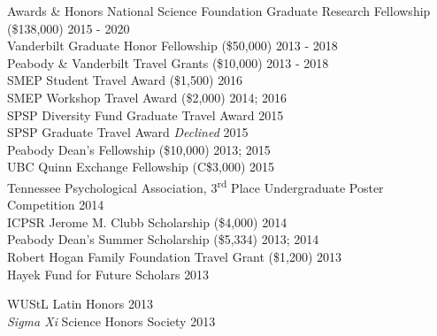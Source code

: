 \begin{rSection}{\textrm{Awards \& Honors}}
National Science Foundation Graduate Research Fellowship (\$138,000) 	\hfill{2015 - 2020}\smallskip\\
Vanderbilt Graduate Honor Fellowship (\$50,000)				\hfill{2013 - 2018}\smallskip\\	
Peabody \& Vanderbilt Travel Grants (\$10,000)				\hfill  {2013 - 2018}\smallskip\\
SMEP Student Travel Award (\$1,500)						\hfill{2016}\smallskip\\
SMEP Workshop Travel Award (\$2,000)					\hfill{2014; 2016}\smallskip\\
SPSP Diversity Fund Graduate Travel Award %
\hfill{2015}\smallskip\\
SPSP Graduate Travel Award %
{\small \textit{Declined}} \hfill{2015}\smallskip\\
Peabody Dean's Fellowship (\$10,000)					\hfill  {2013; 2015}\smallskip\\
UBC Quinn Exchange Fellowship (C\$3,000) \hfill{2015}\smallskip\\
Tennessee Psychological Association, 3\textsuperscript{rd} Place Undergraduate Poster Competition \hfill{2014}\smallskip\\
ICPSR Jerome M. Clubb Scholarship (\$4,000) \hfill{2014}\smallskip\\
Peabody Dean's Summer Scholarship (\$5,334)			    \hfill  {2013; 2014}\smallskip\\	
Robert Hogan Family Foundation Travel Grant (\$1,200) 	\hfill  {2013}\smallskip\\
Hayek Fund for Future Scholars                      \hfill  {2013}\smallskip\\
\begin{minipage}{\linewidth}\vspace{1.1mm} WUStL Latin Honors \hfill  {2013}\smallskip\\
\textit{Sigma Xi} Science Honors Society                    			\hfill  {2013}
\end{minipage}%
\end{rSection}

